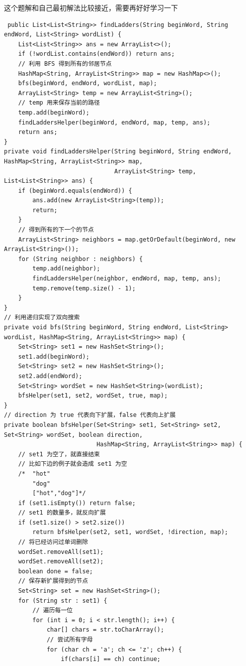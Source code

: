 \documentclass[9pt, b5paaper]{book}
\begin{document}
\begin{enumerate}
这个题解和自己最初解法比较接近，需要再好好学习一下
\begin{verbatim}
 public List<List<String>> findLadders(String beginWord, String endWord, List<String> wordList) {
    List<List<String>> ans = new ArrayList<>();
    if (!wordList.contains(endWord)) return ans;
    // 利用 BFS 得到所有的邻居节点
    HashMap<String, ArrayList<String>> map = new HashMap<>();
    bfs(beginWord, endWord, wordList, map);
    ArrayList<String> temp = new ArrayList<String>();
    // temp 用来保存当前的路径
    temp.add(beginWord);
    findLaddersHelper(beginWord, endWord, map, temp, ans);
    return ans;
}
private void findLaddersHelper(String beginWord, String endWord, HashMap<String, ArrayList<String>> map,
                               ArrayList<String> temp, List<List<String>> ans) {
    if (beginWord.equals(endWord)) {
        ans.add(new ArrayList<String>(temp));
        return;
    }
    // 得到所有的下一个的节点
    ArrayList<String> neighbors = map.getOrDefault(beginWord, new ArrayList<String>());
    for (String neighbor : neighbors) {
        temp.add(neighbor);
        findLaddersHelper(neighbor, endWord, map, temp, ans);
        temp.remove(temp.size() - 1);
    }
}
// 利用递归实现了双向搜索
private void bfs(String beginWord, String endWord, List<String> wordList, HashMap<String, ArrayList<String>> map) {
    Set<String> set1 = new HashSet<String>();
    set1.add(beginWord);
    Set<String> set2 = new HashSet<String>();
    set2.add(endWord);
    Set<String> wordSet = new HashSet<String>(wordList);
    bfsHelper(set1, set2, wordSet, true, map);
}
// direction 为 true 代表向下扩展，false 代表向上扩展
private boolean bfsHelper(Set<String> set1, Set<String> set2, Set<String> wordSet, boolean direction,
                          HashMap<String, ArrayList<String>> map) {
    // set1 为空了，就直接结束
    // 比如下边的例子就会造成 set1 为空
    /*	"hot"
        "dog"
        ["hot","dog"]*/
    if (set1.isEmpty()) return false;
    // set1 的数量多，就反向扩展
    if (set1.size() > set2.size()) 
        return bfsHelper(set2, set1, wordSet, !direction, map);
    // 将已经访问过单词删除
    wordSet.removeAll(set1);
    wordSet.removeAll(set2);
    boolean done = false;
    // 保存新扩展得到的节点
    Set<String> set = new HashSet<String>();
    for (String str : set1) {
        // 遍历每一位
        for (int i = 0; i < str.length(); i++) {
            char[] chars = str.toCharArray();
            // 尝试所有字母
            for (char ch = 'a'; ch <= 'z'; ch++) {
                if(chars[i] == ch) continue;

\end{verbatim}
\end{enumerate}
\end{document}
